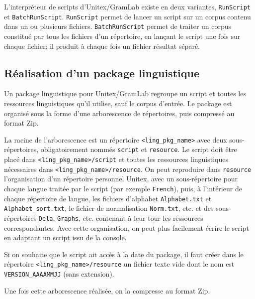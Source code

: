 \bigskip{}
\noindent L'interpréteur de scripts d'Unitex/GramLab existe en deux variantes, \verb$RunScript$ et
\verb$BatchRunScript$. \verb$RunScript$ permet de lancer un script sur un corpus contenu dans un
ou plusieurs fichiers. \verb$BatchRunScript$ permet de traiter un corpus constitué par tous les fichiers
d'un répertoire, en lançant le script une fois sur chaque fichier; il produit à chaque fois un fichier résultat
séparé.



\subsection{Réalisation d'un package linguistique}
\label{section-packaga-creation}

Un package linguistique pour Unitex/GramLab regroupe un script et toutes les ressources linguistiques
qu'il utilise, sauf le corpus d'entrée. Le package est organisé sous la forme d'une arborescence
de répertoires, puis compressé au format Zip.

\bigskip     {}
\noindent La racine de l'arborescence est un répertoire \verb$<ling_pkg_name>$ avec deux
sous-répertoires, obligatoirement nommés \verb$script$ et \verb$resource$. Le script doit être placé
dans \verb$<ling_pkg_name>/script$ et toutes les ressources linguistiques nécessaires dans
\verb$<ling_pkg_name>/resource$. On peut reproduire dans \verb$resource$ l'organisation d'un
répertoire personnel Unitex, avec un sous-répertoire pour chaque langue traitée par le script
(par exemple \verb$French$), puis, à l'intérieur de chaque répertoire de langue, les fichiers d'alphabet
\verb$Alphabet.txt$ et \verb$Alphabet_sort.txt$, le fichier de normalisation \verb$Norm.txt$, etc. et
des sous-répertoires \verb$Dela$, \verb$Graphs$, etc. contenant à leur tour les ressources
correspondantes. Avec cette organisation, on peut plus facilement écrire le script en adaptant un script
issu de la console.

\bigskip
\noindent Si on souhaite que le script ait accès à la date du package, il faut créer dans le
répertoire \verb$<ling_pkg_name>/resource$ un fichier texte vide dont le nom est
\verb$VERSION_AAAAMMJJ$ (sans extension).

\bigskip
\noindent Une fois cette arborescence réalisée, on la compresse au format Zip.

